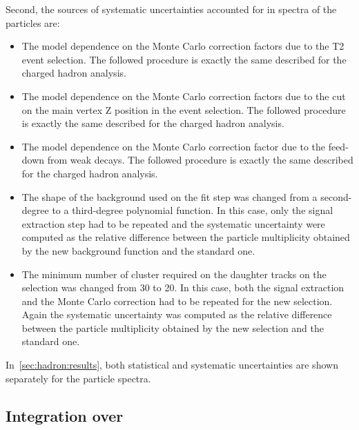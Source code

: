 Second, the sources of systematic uncertainties accounted for in
spectra of the \vzero particles are:
\begin{itemize}
\item The model dependence on the Monte Carlo correction factors due to
  the T2 event selection. The followed procedure is exactly the same described
  for the charged hadron analysis.
  
\item The model dependence on the Monte Carlo correction factors due to
  the cut on the main vertex Z position in the event selection.
  The followed procedure is exactly the same described
  for the charged hadron analysis.
  
\item The model dependence on the Monte Carlo correction factor due to
  the feed-down from weak decays. The followed procedure is exactly the same described
  for the charged hadron analysis.
  
\item The shape of the background used on the \minv fit step
  was changed from a second-degree to a third-degree polynomial
  function. In this case, only the signal extraction step had to be
  repeated and the systematic uncertainty were computed as the relative
  difference between the particle multiplicity obtained by the new
  background function and the standard one.

\item The minimum number of cluster required on the daughter tracks on the
  \vzero selection was changed from 30 to 20. In this case, both the signal
  extraction and the Monte Carlo correction had to be repeated for the new \vzero
  selection. Again the systematic uncertainty was computed as the relative
  difference between the particle multiplicity obtained by the new
  selection and the standard one.

\end{itemize}

In~\cref{sec:hadron:results}, both statistical and systematic uncertainties
are shown separately for the particle spectra.

\subsection{Integration over \pT}
\label{sec:hadron:spec:int}


